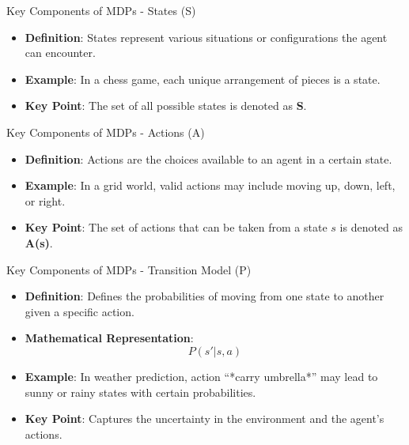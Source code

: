 \documentclass[aspectratio=169]{beamer}
\begin{document}
\begin{frame}[fragile]{Key Components of MDPs - States (S)}
    \begin{itemize}
        \item \textbf{Definition}: States represent various situations or configurations the agent can encounter.
        \item \textbf{Example}: In a chess game, each unique arrangement of pieces is a state.
        \item \textbf{Key Point}: The set of all possible states is denoted as \textbf{S}.
    \end{itemize}
\end{frame}

\begin{frame}[fragile]{Key Components of MDPs - Actions (A)}
    \begin{itemize}
        \item \textbf{Definition}: Actions are the choices available to an agent in a certain state.
        \item \textbf{Example}: In a grid world, valid actions may include moving up, down, left, or right.
        \item \textbf{Key Point}: The set of actions that can be taken from a state \( s \) is denoted as \textbf{A(s)}.
    \end{itemize}
\end{frame}

\begin{frame}[fragile]{Key Components of MDPs - Transition Model (P)}
    \begin{itemize}
        \item \textbf{Definition}: Defines the probabilities of moving from one state to another given a specific action.
        \item \textbf{Mathematical Representation}: 
            \begin{equation}
                P(s' | s, a)
            \end{equation}
        \item \textbf{Example}: In weather prediction, action “*carry umbrella*” may lead to sunny or rainy states with certain probabilities.
        \item \textbf{Key Point}: Captures the uncertainty in the environment and the agent’s actions.
    \end{itemize}
\end{frame}
\end{document}
